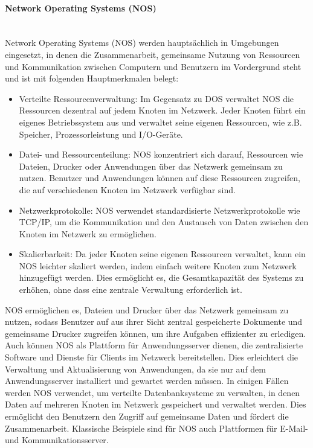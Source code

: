 \documentclass[../vs-script-first-v01.tex]{subfiles}
\begin{document}
\paragraph{Network Operating Systems (NOS)}\mbox{}\\
Network Operating Systems (NOS) werden hauptsächlich in Umgebungen eingesetzt, in denen die Zusammenarbeit, gemeinsame Nutzung von Ressourcen und Kommunikation zwischen Computern und Benutzern im Vordergrund steht und ist mit folgenden Hauptmerkmalen belegt: 
\begin{itemize}
\item Verteilte Ressourcenverwaltung: Im Gegensatz zu DOS verwaltet NOS die Ressourcen dezentral auf jedem Knoten im Netzwerk. Jeder Knoten führt ein eigenes Betriebssystem aus und verwaltet seine eigenen Ressourcen, wie z.B. Speicher, Prozessorleistung und I/O-Geräte.
\item Datei- und Ressourcenteilung: NOS konzentriert sich darauf, Ressourcen wie Dateien, Drucker oder Anwendungen über das Netzwerk gemeinsam zu nutzen. Benutzer und Anwendungen können auf diese Ressourcen zugreifen, die auf verschiedenen Knoten im Netzwerk verfügbar sind.
\item Netzwerkprotokolle: NOS verwendet standardisierte Netzwerkprotokolle wie TCP/IP, um die Kommunikation und den Austausch von Daten zwischen den Knoten im Netzwerk zu ermöglichen.
\item Skalierbarkeit: Da jeder Knoten seine eigenen Ressourcen verwaltet, kann ein NOS leichter skaliert werden, indem einfach weitere Knoten zum Netzwerk hinzugefügt werden. Dies ermöglicht es, die Gesamtkapazität des Systems zu erhöhen, ohne dass eine zentrale Verwaltung erforderlich ist.
\end{itemize}
NOS ermöglichen es, Dateien und Drucker über das Netzwerk gemeinsam zu nutzen, sodass Benutzer auf aus ihrer Sicht zentral gespeicherte Dokumente und gemeinsame Drucker zugreifen können, um ihre Aufgaben effizienter zu erledigen. Auch können NOS als Plattform für Anwendungsserver dienen, die zentralisierte Software und Dienste für Clients im Netzwerk bereitstellen. Dies erleichtert die Verwaltung und Aktualisierung von Anwendungen, da sie nur auf dem Anwendungsserver installiert und gewartet werden müssen. In einigen Fällen werden NOS verwendet, um verteilte Datenbanksysteme zu verwalten, in denen Daten auf mehreren Knoten im Netzwerk gespeichert und verwaltet werden. Dies ermöglicht den Benutzern den Zugriff auf gemeinsame Daten und fördert die Zusammenarbeit. Klassische Beispiele sind für NOS auch Plattformen für E-Mail- und Kommunikationsserver.
\end{document}
